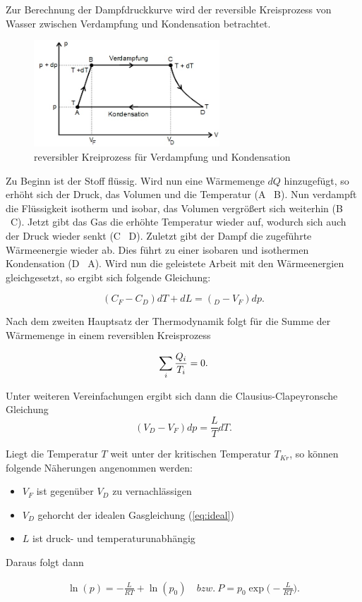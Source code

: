 Zur Berechnung der Dampfdruckkurve wird der reversible Kreisprozess von Wasser
zwischen Verdampfung und Kondensation betrachtet.

\begin{figure}
  \centering
  \includegraphics[height=4cm]{Kreisprozess.jpeg}
  \caption{reversibler Kreiprozess für Verdampfung und Kondensation}
  \label{fig:kreis}
\end{figure}

Zu Beginn ist der Stoff flüssig. Wird nun eine Wärmemenge $dQ$ hinzugefügt,
so erhöht sich der Druck, das Volumen und die Temperatur (A \rightarrow \ B).
Nun verdampft die Flüssigkeit isotherm und isobar, das Volumen
vergrößert sich weiterhin (B \rightarrow \ C). Jetzt gibt das Gas die erhöhte
Temperatur wieder auf, wodurch sich auch der Druck wieder senkt (C \rightarrow \ D).
Zuletzt gibt der Dampf die zugeführte Wärmeenergie wieder ab. Dies führt zu einer
isobaren und isothermen Kondensation (D \rightarrow \ A).
Wird nun die geleistete Arbeit mit den Wärmeenergien gleichgesetzt, so ergibt sich
folgende Gleichung:

\begin{equation}
  (C_F - C_D)dT + dL = (_D - V_F)dp .
\end{equation}

Nach dem zweiten Hauptsatz der Thermodynamik folgt für die Summe der Wärmemenge
in einem reversiblen Kreisprozess

\begin{equation}
  \sum_i{\frac{Q_i}{T_i}} = 0 . \notag
\end{equation}

Unter weiteren Vereinfachungen ergibt sich dann die Clausius-Clapeyronsche
Gleichung
\begin{equation}
  (V_D - V_F)dp = \frac{L}{T}dT .
\end{equation}

Liegt die Temperatur $T$ weit unter der kritischen Temperatur $T_{Kr}$, so können
folgende Näherungen angenommen werden:
\begin{itemize}
  \item $V_F$ ist gegenüber $V_D$ zu vernachlässigen \\
  \item $V_D$ gehorcht der idealen Gasgleichung (\ref{eq:ideal}) \\
  \item $L$ ist druck- und temperaturunabhängig \\
\end{itemize}

Daraus folgt dann

\begin{align}
  \ln{(p)} = -\frac{L}{RT} + \ln{(p_0)}  \ & bzw. \  %
  P = p_0 \exp{\biggr(-\frac{L}{RT} \biggl)} .
\end{align}
